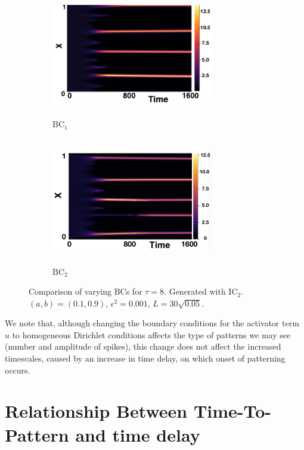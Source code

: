 \begin{figure}[H]
    \centering
    \begin{subfigure}[b]{0.45\textwidth}
        \centering
        \includegraphics[width=7cm,height=5.5cm]{ic28.png}
        \caption{$\text{BC}_1$}
        \label{}
    \end{subfigure}
    \hfill
    \begin{subfigure}[b]{0.45\textwidth}
        \centering
        \includegraphics[width=7cm,height=5.5cm]{bc8.png}
        \caption{$\text{BC}_2$}
        \label{}
    \end{subfigure}
    \caption{Comparison of varying BCs for $\tau=8$. Generated with $\text{IC}_2$. $(a,b)=(0.1,0.9)$, $\epsilon^2=0.001$, $L=30\sqrt{0.05}$.}
    \label{fig:bctau3}
\end{figure}

We note that, although changing the boundary conditions for the activator term $u$ to homogeneous Dirichlet conditions affects the type of patterns we may see (number and amplitude of spikes), this change does not affect the increased timescales, caused by an increase in time delay, on which onset of patterning occurs.

\section{Relationship Between Time-To-Pattern and time delay}\label{section:delaypatt}


